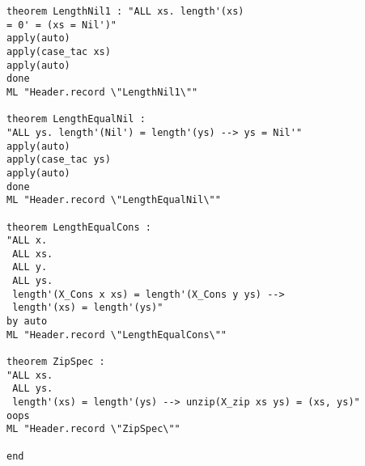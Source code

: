 \begin{multicols}{2}
\begin{Verbatim}
theorem LengthNil1 : "ALL xs. length'(xs) 
= 0' = (xs = Nil')"
apply(auto)
apply(case_tac xs)
apply(auto)
done
ML "Header.record \"LengthNil1\""

theorem LengthEqualNil :
"ALL ys. length'(Nil') = length'(ys) --> ys = Nil'"
apply(auto)
apply(case_tac ys)
apply(auto)
done
ML "Header.record \"LengthEqualNil\""

theorem LengthEqualCons :
"ALL x.
 ALL xs.
 ALL y.
 ALL ys.
 length'(X_Cons x xs) = length'(X_Cons y ys) -->
 length'(xs) = length'(ys)"
by auto
ML "Header.record \"LengthEqualCons\""

theorem ZipSpec :
"ALL xs.
 ALL ys.
 length'(xs) = length'(ys) --> unzip(X_zip xs ys) = (xs, ys)"
oops
ML "Header.record \"ZipSpec\""

end
\end{Verbatim}
\end{multicols}

